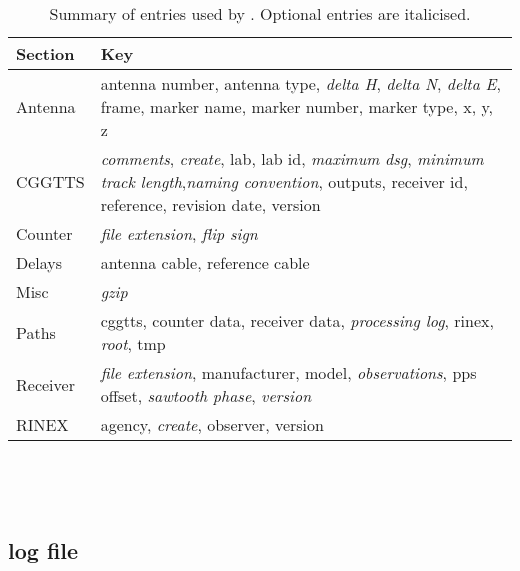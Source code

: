 \begin{table}
\begin{tabular}{l|p{10cm}}
Section & Key \\ \hline
Antenna & antenna number, antenna type, \textit{delta H}, \textit{delta N},
         \textit{delta E}, frame, marker name, marker number, marker type, 
         x, y, z \\ \hline
CGGTTS  & \textit{comments}, \textit{create}, lab, lab id, 
         \textit{maximum dsg}, \textit{minimum track length},\textit{naming convention},
         outputs, receiver id, reference, revision date, version\\
Counter & \textit{file extension}, \textit{flip sign}\\ \hline
Delays  &  antenna cable, reference cable\\
Misc & \textit{gzip}\\
Paths & cggtts, counter data, receiver data, \textit{processing log},
        rinex, \textit{root}, tmp\\
Receiver & \textit{file extension}, manufacturer, model,
          \textit{observations}, pps offset, \textit{sawtooth phase},
          \textit{version}\\ \hline
RINEX & agency, \textit{create}, observer, version\\
\end{tabular}
\caption{Summary of  entries used by . Optional entries are italicised. \label{t:gpscvKeys}}
\end{table}

\begin{lstlisting}




\end{lstlisting}

\subsection{log file}